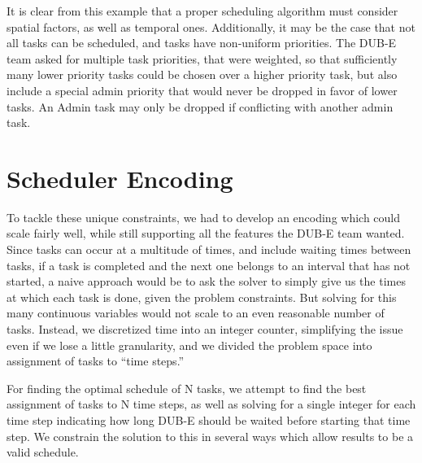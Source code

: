 \documentclass{article}
\begin{document}
\begin{figure}
  \caption{}
  \label{fig:overview-example}
\end{figure}

It is clear from this example that
a proper scheduling algorithm must consider spatial factors,
as well as temporal ones.
Additionally, it may be the case that not all tasks can be scheduled,
and tasks have non-uniform priorities.
The DUB-E team asked for multiple task priorities,
that were weighted,
so that sufficiently many lower priority tasks
could be chosen over a higher priority task,
but also include a special admin priority
that would never be dropped in favor of lower tasks. An
Admin task may only be dropped if conflicting with another admin
task.


\section{Scheduler Encoding}
To tackle these unique constraints,
we had to develop an encoding which could scale fairly well,
while still supporting all the features the DUB-E team wanted.
Since tasks can occur at a multitude of times,
and include waiting times between tasks,
if a task is completed and the next one
belongs to an interval that has not started,
a naive approach would be to ask the solver
to simply give us the times at which each task is done,
given the problem constraints.
But solving for this many continuous variables
would not scale to an even reasonable number of tasks.
Instead, we discretized time into an integer counter,
simplifying the issue even if we lose a little granularity,
and we divided the problem space into assignment of tasks
to ``time steps.''

For finding the optimal schedule of N tasks,
we attempt to find the best assignment
of tasks to N time steps,
as well as solving for a single integer for each time step
indicating how long DUB-E should be waited before starting that time step.
We constrain the solution to this in several ways
which allow results to be a valid schedule.
\end{document}
